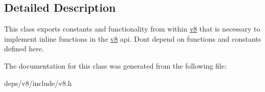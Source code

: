 \subsection{Detailed Description}
This class exports constants and functionality from within \hyperlink{namespacev8}{v8} that is necessary to implement inline functions in the \hyperlink{namespacev8}{v8} api. Don\textquotesingle{}t depend on functions and constants defined here. 

The documentation for this class was generated from the following file\+:\begin{DoxyCompactItemize}
\item 
deps/v8/include/v8.\+h\end{DoxyCompactItemize}
